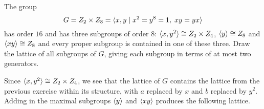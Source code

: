  The group
\begin{equation*}
  G = Z_2\times Z_8 = \langle{x,y\mid x^2 = y^8 = 1,\; xy = yx}\rangle
\end{equation*}
has order $16$ and has three subgroups of order $8$:
$\langle{x,y^2}\rangle\cong Z_2\times Z_4$, $\langle{y}\rangle\cong Z_8$ and
$\langle{xy}\rangle\cong Z_8$ and every proper subgroup is contained in one of
these three. Draw the lattice of all subgroups of $G$, giving each
subgroup in terms of at most two generators.
\begin{solution}
  Since $\langle{x,y^2}\rangle\cong Z_2\times Z_4$, we see that the lattice of
  $G$ contains the lattice from the previous exercise within its
  structure, with $a$ replaced by $x$ and $b$ replaced by
  $y^2$. Adding in the maximal subgroups $\langle{y}\rangle$ and $\langle{xy}\rangle$
  produces the following lattice.
  \begin{center}
  \end{center}
\end{solution}

